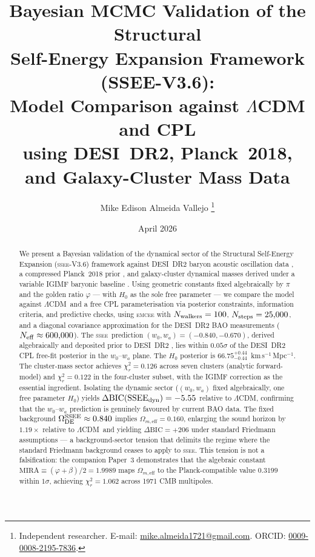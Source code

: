 \documentclass[12pt,a4paper]{article}
\title{\textbf{Bayesian MCMC Validation of the Structural\\
Self-Energy Expansion Framework (SSEE-V3.6)}:\\[6pt]
\large Model Comparison against $\Lambda$CDM and CPL\\
using DESI~DR2, Planck~2018, and Galaxy-Cluster Mass Data}
\author{Mike Edison Almeida Vallejo%
\thanks{Independent researcher. E-mail: \href{mailto:mike.almeida1721@gmail.com}{mike.almeida1721@gmail.com}.
ORCID: \href{https://orcid.org/0009-0008-2195-7836}{0009-0008-2195-7836}.}%
}
\date{April 2026}
\newcommand{\SSEE}{\ifmmode\mathrm{SSEE}\else\textsc{ssee}\fi}
\newcommand{\LCDM}{\ifmmode\Lambda\mathrm{CDM}\else$\Lambda$CDM\fi}
\newcommand{\wz}{w_0}
\newcommand{\wa}{w_a}
\newcommand{\OmDE}{\Omega_{\mathrm{DE}}}
\begin{document}
\maketitle

\begin{abstract}
We present a Bayesian validation of the dynamical sector of the
Structural Self-Energy Expansion (\SSEE-V3.6) framework
\citep{SSEE_paperI} against DESI~DR2 baryon acoustic oscillation data
\citep{DESI_DR2}, a compressed Planck~2018 prior \citep{Planck2018}, and
galaxy-cluster dynamical masses derived under a variable IGIMF baryonic
baseline \citep{Zhang2026}. Using geometric constants fixed algebraically
by $\pi$ and the golden ratio $\varphi$ — with $H_0$ as the sole free
parameter — we compare the model against \LCDM\ and a free CPL
parameterisation via posterior constraints, information criteria, and
predictive checks, using \textsc{emcee} with $N_{\rm walkers}=100$,
$N_{\rm steps}=25{,}000$, and a diagonal covariance approximation for
the DESI~DR2 BAO measurements ($N_{\rm eff}\approx600{,}000$).
The \SSEE\ prediction $(\wz,\wa)=(-0.840,-0.670)$, derived algebraically
and deposited prior to DESI~DR2 \citep{AlmeidaSSEE2026genesis},
lies within $0.05\sigma$ of the DESI~DR2 CPL free-fit posterior in the
$\wz$--$\wa$ plane.
The $H_0$ posterior is $66.75^{+0.44}_{-0.44}$~km\,s$^{-1}$\,Mpc$^{-1}$.
The cluster-mass sector achieves $\chi^2_r=0.126$ across seven clusters
(analytic forward-model) and $\chi^2_r=0.122$ in the four-cluster subset,
with the IGIMF correction as the essential ingredient.
Isolating the dynamic sector ($(w_0,w_a)$ fixed algebraically, one free
parameter $H_0$) yields $\Delta\mathrm{BIC}(\SSEE_{\rm dyn})=-5.55$
relative to \LCDM, confirming that the $\wz$--$\wa$ prediction is
genuinely favoured by current BAO data.
The fixed background $\OmDE^{\SSEE}\approx0.840$ implies
$\Omega_{m,\mathrm{eff}}=0.160$, enlarging the sound horizon by
$1.19\times$ relative to \LCDM\ and yielding $\Delta\mathrm{BIC}=+206$
under standard Friedmann assumptions — a background-sector tension that
delimits the regime where the standard Friedmann background ceases to
apply to \SSEE.  This tension is not a falsification: the companion
Paper~3 demonstrates that the algebraic constant
$\mathrm{MIRA}\equiv(\varphi+\beta)/2=1.9989$ maps
$\Omega_{m,\mathrm{eff}}$ to the Planck-compatible value $0.3199$
within $1\sigma$, achieving $\chi^2_r=1.062$ across 1971 CMB multipoles.
\end{abstract}

\tableofcontents
\newpage
\end{document}
